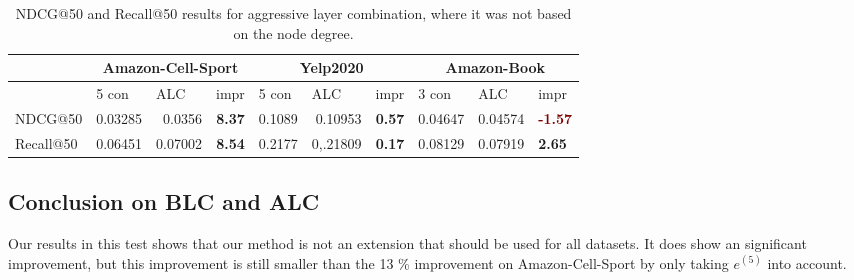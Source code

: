 \begin{table*}[h!]
    \centering
    \begin{tabular}{|l|r|r|r||l|r|r||l|l|l|}
        \hline
                  & \multicolumn{3}{c||}{Amazon-Cell-Sport} & \multicolumn{3}{c||}{Yelp2020} & \multicolumn{3}{c|}{Amazon-Book}                                                                                                                                                                  \\ \hline
                  & \multicolumn{1}{l|}{5 con}              & \multicolumn{1}{l|}{ALC}       & \multicolumn{1}{l||}{impr}            & \multicolumn{1}{l|}{5 con} & \multicolumn{1}{l|}{ALC} & \multicolumn{1}{l||}{impr}            & 3 con   & ALC     & impr                                  \\ \hline
        NDCG@50   & 0.03285                                 & 0.0356                         & \textbf{\textcolor{OliveGreen}{8.37}} & 0.1089                     & 0.10953                  & \textbf{\textcolor{OliveGreen}{0.57}} & 0.04647 & 0.04574 & \textbf{\textcolor{Maroon}{-1.57}}    \\ \hline
        Recall@50 & 0.06451                                 & 0.07002                        & \textbf{\textcolor{OliveGreen}{8.54}} & 0.2177                     & 0,.21809                 & \textbf{\textcolor{OliveGreen}{0.17}} & 0.08129 & 0.07919 & \textbf{\textcolor{OliveGreen}{2.65}} \\ \hline
    \end{tabular}
    \caption{NDCG@50 and Recall@50 results for aggressive layer combination, where it was not based on the node degree.}
    \label{tab:aggressive-layer-combination}
\end{table*}


\subsection{Conclusion on BLC and ALC}
Our results in this test shows that our method is not an extension that should be used for all datasets.
It does show an significant improvement, but this improvement is still smaller than the 13 \% improvement on Amazon-Cell-Sport by only taking $e^{(5)}$ into account.
